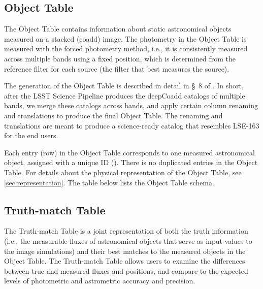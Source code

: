 \documentclass[11pt]{report}
\begin{document}
\subsection{Object Table}
\label{sec:object}

The Object Table contains information about static astronomical objects measured on a stacked (coadd) image. The photometry in the Object Table is measured with the forced photometry method, i.e., it is consistently measured across multiple bands using a fixed position, which is determined from the reference filter for each source (the filter that best measures the source). 

The generation of the Object Table is described in detail in \S~8 of \cite{2020arXiv201005926L}. In short, after the LSST Science Pipeline produces the deepCoadd catalogs of multiple bands, we merge these catalogs across bands, and apply certain column renaming and translations to produce the final Object Table. The renaming and translations are meant to produce a science-ready catalog that resembles LSE-163 for the end users. 

Each entry (row) in the Object Table corresponds to one measured astronomical object, assigned with a unique ID (). There is no duplicated entries in the Object Table. For details about the physical representation of the Object Table, see \autoref{sec:representation}. The table below lists the Object Table schema. 


\subsection{Truth-match Table}
\label{sec:truth}

The Truth-match Table is a joint representation of both the truth information (i.e., the measurable fluxes of astronomical objects that serve as input values to the image simulations) and their best matches to the measured objects in the Object Table. The Truth-match Table allows users to examine the differences between true and measured fluxes and positions, and compare to the expected levels of photometric and astrometric accuracy and precision.
\end{document}
